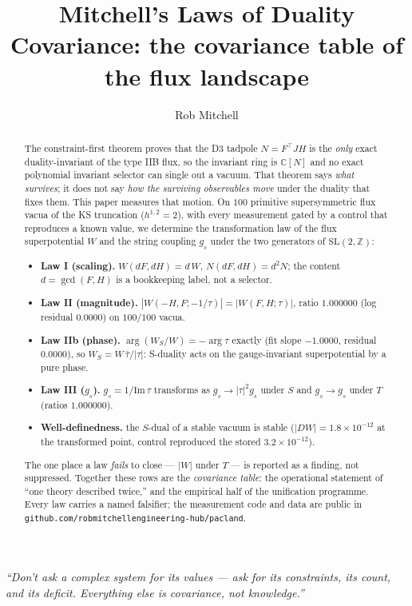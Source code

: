 \documentclass[11pt]{article}
\title{Mitchell's Laws of Duality Covariance: the covariance table of the flux landscape}
\author{Rob Mitchell}
\date{}
\newcommand{\flux}{F}
\newcommand{\hh}{H}
\newcommand{\tauu}{\tau}
\begin{document}
\maketitle

\begin{center}\itshape
``Don't ask a complex system for its values --- ask for its constraints, its count, and its
deficit. Everything else is covariance, not knowledge.''
\end{center}

\begin{abstract}
The constraint-first theorem proves that the D3 tadpole $N=\flux^\top J\hh$ is the
\emph{only} exact duality-invariant of the type IIB flux, so the invariant ring is
$\mathbb{C}[N]$ and no exact polynomial invariant selector can single out a vacuum. That theorem
says \emph{what survives}; it does not say \emph{how the surviving observables move}
under the duality that fixes them. This paper measures that motion. On $100$ primitive
supersymmetric flux vacua of the KS truncation ($h^{1,2}=2$), with every measurement
gated by a control that reproduces a known value, we determine the transformation law
of the flux superpotential $W$ and the string coupling $g_s$ under the two generators
of $\mathrm{SL}(2,\mathbb{Z})$:
\begin{itemize}
  \item \textbf{Law I (scaling).} $W(d\flux,d\hh)=d\,W$, $N(d\flux,d\hh)=d^2N$; the
    content $d=\gcd(\flux,\hh)$ is a bookkeeping label, not a selector.
  \item \textbf{Law II (magnitude).} $|W(-\hh,\flux;-1/\tauu)|=|W(\flux,\hh;\tauu)|$,
    ratio $1.000000$ (log residual $0.0000$) on $100/100$ vacua.
  \item \textbf{Law IIb (phase).} $\arg(W_S/W)=-\arg\tauu$ exactly (fit slope
    $-1.0000$, residual $0.0000$), so $W_S = W\,\bar\tauu/|\tauu|$: S-duality acts on
    the gauge-invariant superpotential by a pure phase.
  \item \textbf{Law III ($g_s$).} $g_s=1/\mathrm{Im}\,\tauu$ transforms as
    $g_s\to|\tauu|^2 g_s$ under $S$ and $g_s\to g_s$ under $T$ (ratios $1.000000$).
  \item \textbf{Well-definedness.} the $S$-dual of a stable vacuum is stable
    ($|DW|=1.8\times10^{-12}$ at the transformed point, control reproduced the stored
    $3.2\times10^{-12}$).
\end{itemize}
The one place a law \emph{fails} to close --- $|W|$ under $T$ --- is reported as a
finding, not suppressed. Together these rows are the \emph{covariance table}: the
operational statement of ``one theory described twice,'' and the empirical half of the
unification programme. Every law carries a named falsifier; the measurement code and
data are public in \texttt{github.com/robmitchellengineering-hub/pacland}.
\end{abstract}
\end{document}
